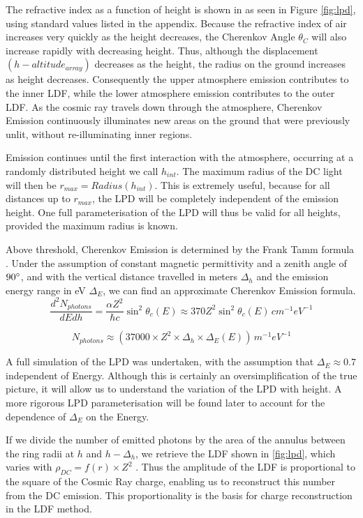 \documentclass[11pt]{article}
\begin{document}
The refractive index as a function of height is shown in as seen in Figure \ref{fig:lpd}, using standard values listed in the appendix. Because the refractive index of air increases very quickly as the height decreases, the Cherenkov Angle $\theta_{C}$ will also increase rapidly with decreasing height. Thus, although the displacement $(h - altitude_{array})$ decreases as the height, the radius on the ground increases as height decreases. Consequently the upper atmosphere emission contributes to the inner LDF, while the lower atmosphere emission contributes to the outer LDF. As the cosmic ray travels down through the atmosphere, Cherenkov Emission continuously illuminates new areas on the ground that were previously unlit, without re-illuminating inner regions. 

Emission continues until the first interaction with the atmosphere, occurring at a randomly distributed height we call $h_{int}$. The maximum radius of the DC light will then be $r_{max} = Radius(h_{int})$. This is extremely useful, because for all distances up to $r_{max}$, the LPD will be completely independent of the emission height. One full parameterisation of the LPD will thus be valid for all heights, provided the maximum radius is known.

Above threshold, Cherenkov Emission is determined by the Frank Tamm formula \cite{ppreview}.  Under the assumption of constant magnetic permittivity and a zenith angle of $90\degree$, and with  the vertical distance travelled in meters $\Delta_{h}$ and the emission energy range in eV $\Delta_{E}$, we can find an approximate Cherenkov Emission formula.
\[ \frac{d^{2}N_{photons}}{dEdh} = \frac{\alpha Z^{2}}{\hbar c} \sin^{2} \theta_{c}(E) \approx 370 Z^{2} \sin^{2} \theta_{c}(E)\, cm^{-1}eV^{-1} \]

\[ N_{photons} \approx (37000 \times Z^{2} \times \Delta_{h} \times \Delta_{E}(E))\, m^{-1}eV^{-1}\]
 
A full simulation of the LPD was undertaken, with the assumption that $\Delta_{E} \approx 0.7$ independent of Energy. Although this is certainly an oversimplification of the true picture, it will allow us to understand the variation of the LPD with height. A more rigorous LPD parameterisation will be found later to account for the dependence of $\Delta_{E}$ on the Energy. 

If we divide the number of emitted photons by the area of the annulus between the ring radii at $h$ and $h - \Delta_{h}$, we retrieve the LDF shown in \ref{fig:lpd}, which varies with $ \rho_{DC}  = f(r) \times Z^{2}$ . Thus the amplitude of the LDF is proportional to the square of the Cosmic Ray charge, enabling us to reconstruct this number from the DC emission. This proportionality is the basis for charge reconstruction in the LDF method.
\end{document}
